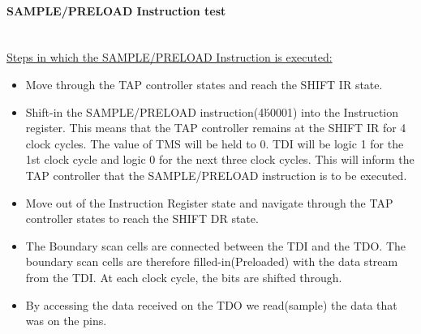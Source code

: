 \documentclass[a4paper,11pt]{article}
\begin{document}
\paragraph{SAMPLE/PRELOAD Instruction test}\mbox{}\\
\underline{Steps in which the SAMPLE/PRELOAD Instruction is executed:}
\begin{itemize}[noitemsep]
\item Move through the TAP controller states and reach the SHIFT IR state.
\item Shift-in the SAMPLE/PRELOAD instruction(4\'b0001) into the Instruction register. This means that the TAP controller remains at the SHIFT IR for 4 clock cycles. The value of TMS will be held to 0. TDI will be logic 1 for the 1st clock cycle and logic 0 for the next three clock cycles. This will inform the TAP controller that the SAMPLE/PRELOAD instruction is to be executed.
\item Move out of the Instruction Register state and navigate through the TAP controller states to reach the SHIFT DR state.
\item The Boundary scan cells are connected between the TDI and the TDO. The boundary scan cells are therefore filled-in(Preloaded) with the data stream from the TDI. At each clock cycle, the bits are shifted through. 
\item By accessing the data received on the TDO we read(sample) the data that was on the pins.
\end{itemize}
\end{document}
